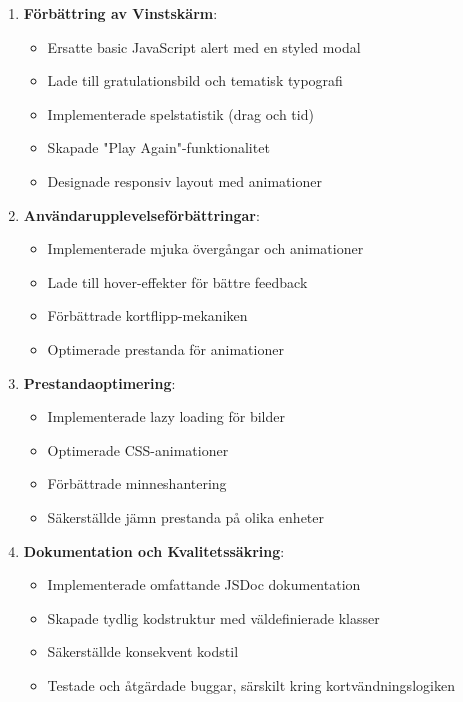 \documentclass[a4paper,12pt]{article}
\begin{document}
\begin{enumerate}
    \item \textbf{Förbättring av Vinstskärm}:
    \begin{itemize}
        \item Ersatte basic JavaScript alert med en styled modal
        \item Lade till gratulationsbild och tematisk typografi
        \item Implementerade spelstatistik (drag och tid)
        \item Skapade "Play Again"-funktionalitet
        \item Designade responsiv layout med animationer
    \end{itemize}

    \item \textbf{Användarupplevelseförbättringar}:
    \begin{itemize}
        \item Implementerade mjuka övergångar och animationer
        \item Lade till hover-effekter för bättre feedback
        \item Förbättrade kortflipp-mekaniken
        \item Optimerade prestanda för animationer
    \end{itemize}

    \item \textbf{Prestandaoptimering}:
    \begin{itemize}
        \item Implementerade lazy loading för bilder
        \item Optimerade CSS-animationer
        \item Förbättrade minneshantering
        \item Säkerställde jämn prestanda på olika enheter
    \end{itemize}

    \item \textbf{Dokumentation och Kvalitetssäkring}:
    \begin{itemize}
        \item Implementerade omfattande JSDoc dokumentation
        \item Skapade tydlig kodstruktur med väldefinierade klasser
        \item Säkerställde konsekvent kodstil
        \item Testade och åtgärdade buggar, särskilt kring kortvändningslogiken
    \end{itemize}
\end{enumerate}
\end{document}
